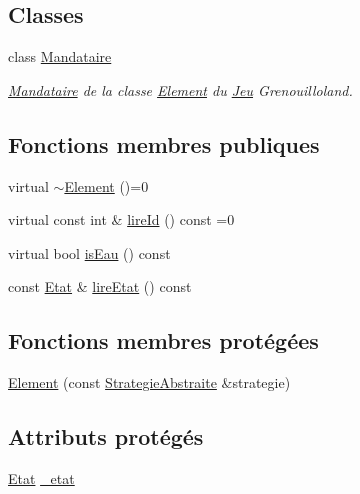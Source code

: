 \subsection*{Classes}
\begin{DoxyCompactItemize}
\item 
class \hyperlink{classgrenouilloland_1_1Element_1_1Mandataire}{Mandataire}
\begin{DoxyCompactList}\small\item\em \hyperlink{classgrenouilloland_1_1Element_1_1Mandataire}{Mandataire} de la classe \hyperlink{classgrenouilloland_1_1Element}{Element} du \hyperlink{classgrenouilloland_1_1Jeu}{Jeu} Grenouilloland. \end{DoxyCompactList}\end{DoxyCompactItemize}
\subsection*{Fonctions membres publiques}
\begin{DoxyCompactItemize}
\item 
virtual \hyperlink{classgrenouilloland_1_1Element_aa66f20df4bbbd9c2253f80e612204f18}{$\sim$\-Element} ()=0
\item 
virtual const int \& \hyperlink{classgrenouilloland_1_1Element_aa05b1a2f2e0e8eb0e5ebf942b8934388}{lire\-Id} () const =0
\item 
virtual bool \hyperlink{classgrenouilloland_1_1Element_adf2a739bbd6b529dc387cb95cb925f53}{is\-Eau} () const 
\item 
const \hyperlink{classgrenouilloland_1_1Etat}{Etat} \& \hyperlink{classgrenouilloland_1_1Element_a2391eb9fde2b7d5afd8588f9141d0a35}{lire\-Etat} () const 
\end{DoxyCompactItemize}
\subsection*{Fonctions membres protégées}
\begin{DoxyCompactItemize}
\item 
\hyperlink{classgrenouilloland_1_1Element_a6177b43ce377505948db0db58316fa0f}{Element} (const \hyperlink{classgrenouilloland_1_1StrategieAbstraite}{Strategie\-Abstraite} \&strategie)
\end{DoxyCompactItemize}
\subsection*{Attributs protégés}
\begin{DoxyCompactItemize}
\item 
\hyperlink{classgrenouilloland_1_1Etat}{Etat} \hyperlink{classgrenouilloland_1_1Element_a6c404d7c7e11b3add7b2cc899c4a3685}{\-\_\-etat}
\end{DoxyCompactItemize}


